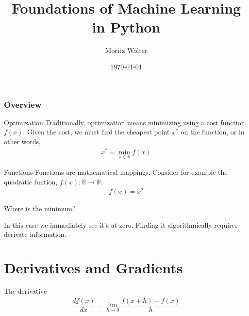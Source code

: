 \documentclass{beamer}
\title{Foundations of Machine Learning in Python}
\institute{High Performance Computing and Analytics Lab, Uni Bonn}
\author{Moritz Wolter}
\date{\today}
\begin{document}
    \maketitle

    \begin{frame}
    \frametitle{Overview} 
    \tableofcontents

    \end{frame}


    \begin{frame}{Optimization}
      Traditionally, optimization means minimizing using a cost function $f(x)$.
      Given the cost, we must find the cheapest point $x^*$ on the function,
      or in other words,
      \begin{align}
       x^* = \min_{x \in \mathbb{R}} f(x)        
      \end{align}
    \end{frame}

    \begin{frame}{Functions}
      Functions are mathematical mappings. Consider for example the quadratic funtion,
      $f(x): \mathbb{R} \rightarrow \mathbb{R}$:
      \begin{align}
        f(x) = x^2
      \end{align}

    \begin{figure}
      
    \end{figure}
    \end{frame}

    \begin{frame}{Where is the minimum?}
      \begin{figure}
        
      \end{figure}
      In this case we immediately see it's at zero. Finding it algorithmically requires derivate information.
    \end{frame}


    \section{Derivatives and Gradients}
    \begin{frame}{The derivative}
      \begin{align}
        \dfrac{d f(x)}{dx} = \lim_{h \rightarrow 0} \dfrac{f(x + h) - f(x)}{h}
      \end{align}
      \begin{figure}
        
      \end{figure}
    \end{frame}
\end{document}
